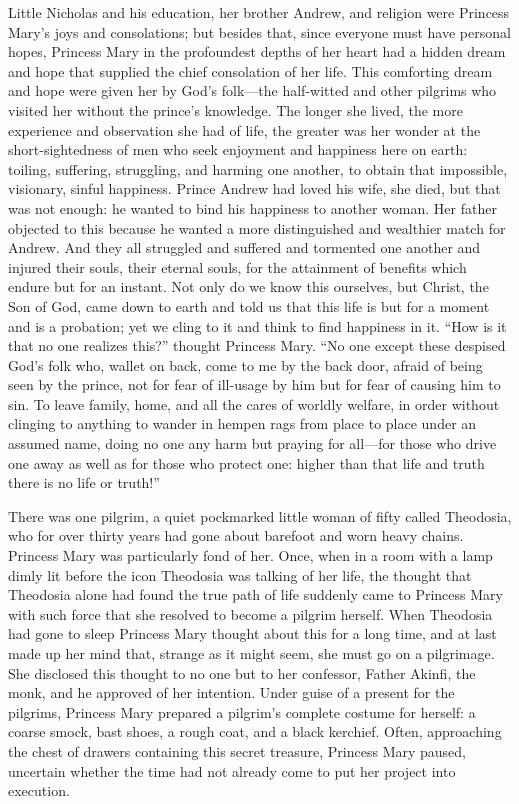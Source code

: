 Little Nicholas and his education, her brother Andrew, and
religion were Princess Mary's joys and consolations; but besides
that, since everyone must have personal hopes, Princess Mary in
the profoundest depths of her heart had a hidden dream and hope
that supplied the chief consolation of her life. This comforting
dream and hope were given her by God's folk---the half-witted and
other pilgrims who visited her without the prince's
knowledge. The longer she lived, the more experience and
observation she had of life, the greater was her wonder at the
short-sightedness of men who seek enjoyment and happiness here on
earth: toiling, suffering, struggling, and harming one another,
to obtain that impossible, visionary, sinful happiness. Prince
Andrew had loved his wife, she died, but that was not enough: he
wanted to bind his happiness to another woman. Her father
objected to this because he wanted a more distinguished and
wealthier match for Andrew. And they all struggled and suffered
and tormented one another and injured their souls, their eternal
souls, for the attainment of benefits which endure but for an
instant. Not only do we know this ourselves, but Christ, the Son
of God, came down to earth and told us that this life is but for
a moment and is a probation; yet we cling to it and think to find
happiness in it. ``How is it that no one realizes this?'' thought
Princess Mary. ``No one except these despised God's folk who,
wallet on back, come to me by the back door, afraid of being seen
by the prince, not for fear of ill-usage by him but for fear of
causing him to sin. To leave family, home, and all the cares of
worldly welfare, in order without clinging to anything to wander
in hempen rags from place to place under an assumed name, doing
no one any harm but praying for all---for those who drive one
away as well as for those who protect one: higher than that life
and truth there is no life or truth!''

There was one pilgrim, a quiet pockmarked little woman of fifty
called Theodosia, who for over thirty years had gone about
barefoot and worn heavy chains. Princess Mary was particularly
fond of her. Once, when in a room with a lamp dimly lit before
the icon Theodosia was talking of her life, the thought that
Theodosia alone had found the true path of life suddenly came to
Princess Mary with such force that she resolved to become a
pilgrim herself. When Theodosia had gone to sleep Princess Mary
thought about this for a long time, and at last made up her mind
that, strange as it might seem, she must go on a pilgrimage. She
disclosed this thought to no one but to her confessor, Father
Akinfi, the monk, and he approved of her intention. Under guise
of a present for the pilgrims, Princess Mary prepared a pilgrim's
complete costume for herself: a coarse smock, bast shoes, a rough
coat, and a black kerchief.  Often, approaching the chest of
drawers containing this secret treasure, Princess Mary paused,
uncertain whether the time had not already come to put her
project into execution.

